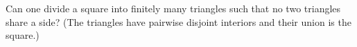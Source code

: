 Can one divide a square into finitely many triangles such that no two triangles share a side? (The triangles have pairwise disjoint interiors and their union is the square.)